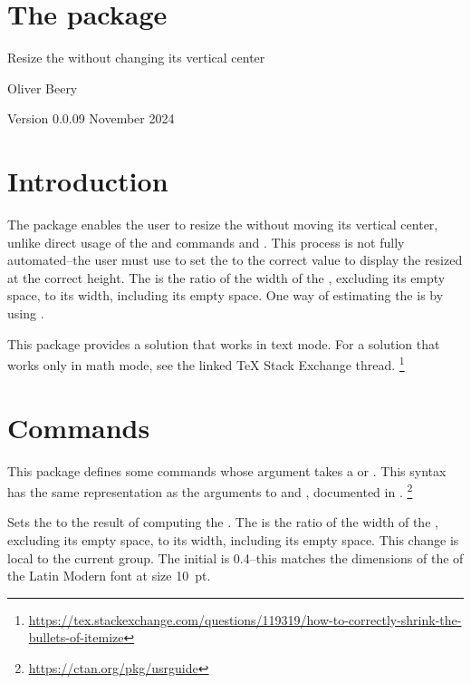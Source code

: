 \documentclass{beery}
\begin{document}
\section*
  {%
    The  package%
  }

Resize the  without changing its vertical center

Oliver Beery

Version 0.0.0\quad{}9 November 2024


\section{Introduction}
\label{sec:intro}

The  package enables the user to resize the  without moving its vertical center, unlike direct usage of the \LaTeXe{} and  commands  and .
This process is not fully automated\---the user must use  to set the \textbulletfactor{} to the correct value to display the resized  at the correct height.
The \textbulletfactor{} is the ratio of the width of the , excluding its empty space, to its width, including its empty space.
One way of estimating the \textbulletfactor{} is by using .

This package provides a solution that works in text mode.
For a solution that works only in math mode, see the linked \TeX{} Stack Exchange thread.%
\footnote{\url{https://tex.stackexchange.com/questions/119319/how-to-correctly-shrink-the-bullets-of-itemize}}


\section{Commands}
\label{sec:commands}

This package defines some commands whose argument takes a  or .
This syntax has the same representation as the arguments to  and , documented in .%
\footnote{\url{https://ctan.org/pkg/usrguide}}

 
\KeepNextPar*

Sets the \textbulletfactor{} to the result of computing the .
The \textbulletfactor{} is the ratio of the width of the , excluding its empty space, to its width, including its empty space.
This change is local to the current group.
The initial \textbulletfactor{} is \num{0.4}\---this matches the dimensions of the  of the Latin Modern font at size \qty{10}{pt}.
\end{document}
